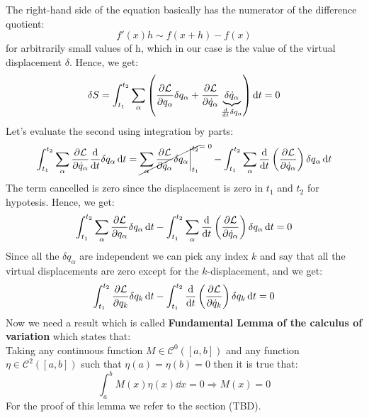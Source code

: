 The right-hand side of the equation basically has the numerator of the difference quotient:
\begin{equation}
    f'(x)h \sim f(x+h) - f(x)
\end{equation}
for arbitrarily small values of h, which in our case is the value of the virtual displacement $\delta$. Hence, we get:
\begin{equation}
    \delta S = \int_{t_1}^{t_2}\bigsum_{\alpha}\brackets{\pdv{\lagr}{q_{\alpha}}\delta q_{\alpha} + \pdv{\lagr}{\dot{q}_{\alpha}} \underbrace{\delta \dot{q}_{\alpha}}_{\frac{\dd{}}{\dd{t}}\delta q_{\alpha}}} \dd{t} = 0
\end{equation}
Let's evaluate the second using integration by parts:
\begin{equation}
    \int_{t_1}^{t_2}\bigsum_{\alpha}\pdv{\lagr}{\dot{q}_{\alpha}} \dv{}{t}\delta q_{\alpha} \dd{t} = \crossout{\bigsum_{\alpha}\pdv{\lagr}{\dot{q}_{\alpha}} \delta q_{\alpha}\bigg|_{t_1}^{t_2}} - \int_{t_1}^{t_2}\bigsum_{\alpha}\dv{}{t}\brackets{\pdv{\lagr}{\dot{q}_{\alpha}}} \delta q_{\alpha} \dd{t}
\end{equation}
The term cancelled is zero since the displacement is zero in $t_1$ and $t_2$ for hypotesis. Hence, we get:
\begin{equation}
    \int_{t_1}^{t_2}\bigsum_{\alpha}\pdv{\lagr}{q_{\alpha}}\delta q_{\alpha} \dd{t} - \int_{t_1}^{t_2}\bigsum_{\alpha}\dv{}{t}\brackets{\pdv{\lagr}{\dot{q}_{\alpha}}} \delta q_{\alpha} \dd{t} = 0
\end{equation}
Since all the $\delta q_{\alpha}$ are independent we can pick any index $k$ and say that all the virtual displacements are zero except for the $k$-displacement, and we get:
\begin{equation}
    \int_{t_1}^{t_2}\dfrac{\partial \lagr}{\partial q_{k}}\delta q_{k} \dd{t} - \int_{t_1}^{t_2}\dv{}{t}\brackets{\dfrac{\partial \lagr}{\partial \dot{q}_{k}}} \delta q_{k} \dd{t} = 0
\end{equation}
Now we need a result which is called \textbf{Fundamental Lemma of the calculus of variation} which states that:\\
Taking any continuous function $M\in\mathcal{C}^0([a,b])$ and any function $\eta \in \mathcal{C}^2([a,b])$ such that $\eta(a) = \eta(b) = 0$ then it is true that:
\begin{equation} \label{e:Fundamental_lemma_variation_calculus}
    \int_{a}^{b}M(x)\eta(x)\dd{x} = 0 \Rightarrow M(x) = 0
\end{equation}
For the proof of this lemma we refer to the section (TBD).\\
